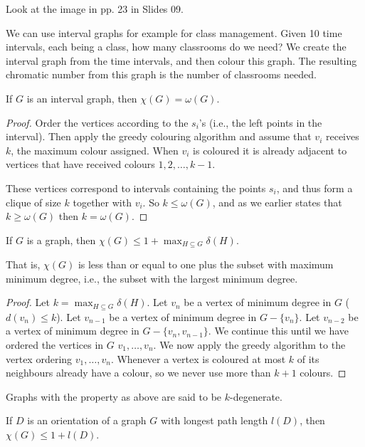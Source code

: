 Look at the image in pp. 23 in Slides 09.

We can use interval graphs for example for class management. Given 10 time intervals, each being a class, how many classrooms do we need? We create the interval graph from the time intervals, and then colour this graph. The resulting chromatic number from this graph is the number of classrooms needed.

\begin{proposition}
	If $G$ is an interval graph, then $\chi(G) = \omega (G)$.
\end{proposition}

\begin{proof}
	Order the vertices according to the $s_{i}$'s (i.e., the left points in the interval). Then apply the greedy colouring algorithm and assume that $v_{i}$ receives $k$, the maximum colour assigned. When $v_{i}$ is coloured it is already adjacent to vertices that have received colours $1, 2, \ldots, k-1$.

	These vertices correspond to intervals containing the points $s_{i}$, and thus form a clique of size $k$ together with $v_{i}$. So $k \le \omega (G)$, and as we earlier states that $k \ge \omega (G)$ then $k = \omega (G)$.
\end{proof}

\begin{theorem}
	If $G$ is a graph, then $\chi (G) \le 1 + \max_{H \subseteq G} \delta (H)$.
\end{theorem}

That is, $\chi(G)$ is less than or equal to one plus the subset with maximum minimum degree, i.e., the subset with the largest minimum degree.

\begin{proof}
	Let $k = \max_{H \subseteq G} \delta (H)$. Let $v_{n}$ be a vertex of minimum degree in $G$ ($d(v_{n}) \le k$). Let $v_{n-1}$ be a vertex of minimum degree in $G - \{v_{n}\}$. Let $v_{n-2}$ be a vertex of minimum degree in $G - \{v_{n}, v_{n-1}\}$. We continue this until we have ordered the vertices in $G$ $v_{1}, \ldots, v_{n}$. We now apply the greedy algorithm to the vertex ordering $v_{1}, \ldots, v_{n}$. Whenever a vertex is coloured at most $k$ of its neighbours already have a colour, so we never use more than $k+1$ colours.
\end{proof}

Graphs with the property as above are said to be $k$-degenerate.

\begin{theorem}
	If $D$ is an orientation of a graph $G$ with longest path length $l(D)$, then $\chi(G) \le 1+l(D)$.
\end{theorem}

